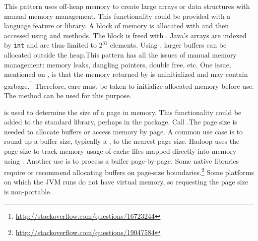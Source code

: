 \newcommand\foundinlargearrays{12}
\newcommand\usedbylargearrays{487}
\newcommand\mostusedlargearrays{\largearraysmost}
\newcommand\memberslargearrays{\member{allocate\-Memory}, \member{free\-Memory}, \member{setMemory}, \member{getInt}, \member{getLong}, \member{putInt}, \member{putLong}}
\newcommand\namelargearrays{Large Arrays and Off-Heap Data Structures}

%
{This pattern uses off-heap memory to create large arrays or data structures with manual memory management.}
{This functionality could be provided with a language feature or library.}
{A block of memory is allocated with  and then
accessed using  and  methods.
The block is freed with .}
{Java's arrays are indexed by \texttt{int} and are thus limited to $2^{31}$
elements. Using \unsafe{}, larger buffers can be allocated outside the heap.}{This pattern has all the issues of manual memory
management: memory leaks, dangling pointers, double free, etc.
One issue, mentioned on
\stackoverflow, is that the memory returned by  is
uninitialized and may contain
garbage.\footnote{\url{http://stackoverflow.com/questions/16723244}}
Therefore, care must be taken to initialize allocated memory before use.
The \unsafe{} method  can be used for this purpose.
}

\newcommand\foundinpage{11}
\newcommand\usedbypage{359}
\newcommand\mostusedpage{\pagemost}
\newcommand\memberspage{\member{pageSize}}
\newcommand\namepage{Get Memory Page Size}


%
{\smu{} is used to determine the size of a page in memory.}
{This functionality could be added to the standard library, perhaps in
the  package.}
{Call .}{The page size is needed to allocate buffers or
  access memory by page.
  A common use case is to round up a buffer size,
  typically a , to the
  nearest page size. Hadoop uses the page size to track memory usage of
  cache files mapped directly into memory
using . Another use is to process a
buffer page-by-page.
Some native libraries require or recommend allocating buffers on page-size
boundaries.\footnote{\url{http://stackoverflow.com/questions/19047584}}
}{Some platforms on which the JVM runs do not have
  virtual memory, so requesting the page size is non-portable.
}

\newcommand\foundinclass{21}
\newcommand\usedbyclass{294}
\newcommand\mostusedclass{\classmost}
\newcommand\membersclass{\member{define\-Class}}
\newcommand\nameclass{Load Class without Security Checks}

